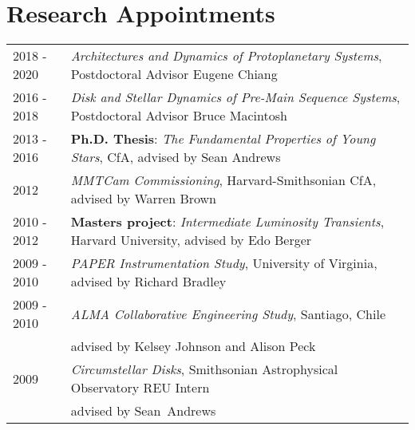 \section*{Research Appointments}
\begin{tabular*}{\textwidth}{@{\hspace{10pt}}p{1in}l}
2018 - 2020 & \emph{Architectures and Dynamics of Protoplanetary Systems}, Postdoctoral Advisor Eugene Chiang \\
2016 - 2018 & \emph{Disk and Stellar Dynamics of Pre-Main Sequence Systems}, Postdoctoral Advisor Bruce Macintosh \\
2013 - 2016 & \textbf{Ph.D. Thesis}: \emph{The Fundamental Properties of Young Stars}, CfA, advised by Sean Andrews\\
2012 & \emph{MMTCam Commissioning}, Harvard-Smithsonian CfA, advised by Warren Brown\\
2010 - 2012 & \textbf{Masters project}: \emph{Intermediate Luminosity Transients}, Harvard University, advised by Edo Berger\\
2009 - 2010 & \emph{PAPER Instrumentation Study}, University of Virginia, advised by Richard Bradley\\
2009 - 2010 & \emph{ALMA Collaborative Engineering Study}, Santiago, Chile\\
& advised by Kelsey Johnson and Alison Peck\\
2009 & \emph{Circumstellar Disks}, Smithsonian Astrophysical Observatory REU Intern\\
& advised by Sean~Andrews\\
\end{tabular*}